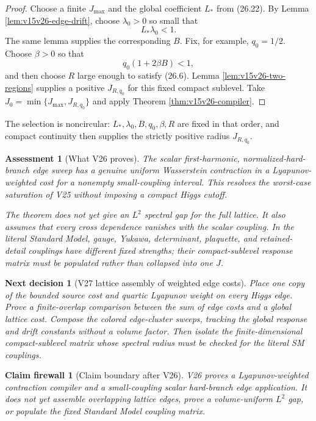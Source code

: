 \documentclass[11pt]{article}
\newtheorem{firewall}[theorem]{Claim firewall}
\newtheorem{decision}[theorem]{Next decision}
\newtheorem{assessment}[theorem]{Assessment}
\theoremstyle{remark}
\begin{document}
\begin{proof}
Choose a finite \(J_{\max}\) and the global coefficient \(L_*\)
from (26.22).  By Lemma \ref{lem:v15v26-edge-drift}, choose
\(\lambda_0>0\) so small that
\[
 L_*\lambda_0<1.                                           \tag{26.25}
\]
The same lemma supplies the corresponding \(B\).  Fix, for
example, \(q_0=1/2\).  Choose \(\beta>0\) so that
\[
 q_0(1+2\beta B)<1,
\]
and then choose \(R\) large enough to satisfy (26.6).  Lemma
\ref{lem:v15v26-two-regions} supplies a positive
\(J_{R,q_0}\) for this fixed compact sublevel.  Take
\(J_0=\min\{J_{\max},J_{R,q_0}\}\) and apply Theorem
\ref{thm:v15v26-compiler}.
\end{proof}

The selection is noncircular:
\(L_*,\lambda_0,B,q_0,\beta,R\) are fixed in that order, and
compact continuity then supplies the
strictly positive radius \(J_{R,q_0}\).

\begin{assessment}[What V26 proves]
\label{ass:v15v26-reading}
The scalar first-harmonic, normalized-hard-branch edge sweep has a
genuine uniform Wasserstein contraction in a Lyapunov-weighted cost
for a nonempty small-coupling interval.  This resolves the
worst-case saturation of V25 without imposing a compact Higgs
cutoff.

The theorem does not yet give an \(L^2\) spectral gap for the full
lattice.  It also assumes that every cross dependence vanishes with
the scalar coupling.  In the literal Standard Model, gauge,
Yukawa, determinant, plaquette, and retained-detail couplings have
different fixed strengths; their compact-sublevel response matrix
must be populated rather than collapsed into one \(J\).
\end{assessment}

\begin{decision}[V27 lattice assembly of weighted edge costs]
\label{dec:v15v26-next}
Place one copy of the bounded source cost and quartic Lyapunov
weight on every Higgs edge.  Prove a finite-overlap comparison
between the sum of edge costs and a global lattice cost.  Compose
the colored edge-cluster sweeps, tracking the global response and
drift constants without a volume factor.  Then isolate the
finite-dimensional compact-sublevel matrix whose spectral radius
must be checked for the literal SM couplings.
\end{decision}

\begin{firewall}[Claim boundary after V26]
\label{fire:v15v26}
V26 proves a Lyapunov-weighted contraction compiler and a
small-coupling scalar hard-branch edge application.  It does not
yet assemble overlapping lattice edges, prove a volume-uniform
\(L^2\) gap, or populate the fixed Standard Model coupling matrix.
\end{firewall}
\end{document}
